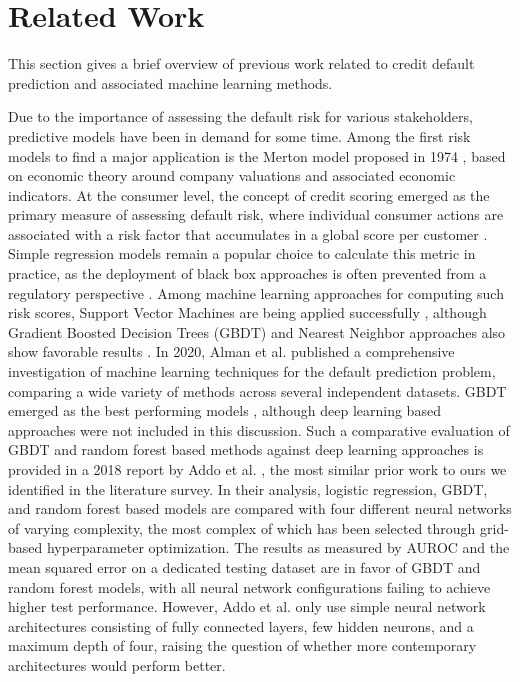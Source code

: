 \documentclass[runningheads]{llncs}
\begin{document}
\section{Related Work}
\label{sec:prereq}

This section gives a brief overview of previous work related to credit default prediction and associated machine learning methods.

Due to the importance of assessing the default risk for various stakeholders, predictive models have been in demand for some time. Among the first risk models to find a major application is the Merton model proposed in 1974 \cite{merton1974pricing}, based on economic theory around company valuations and associated economic indicators. At the consumer level, the concept of credit scoring emerged as the primary measure of assessing default risk, where individual consumer actions are associated with a risk factor that accumulates in a global score per customer \cite{hand1997statistical}. Simple regression models remain a popular choice to calculate this metric in practice, as the deployment of black box approaches is often prevented from a regulatory perspective \cite{lee2021graph}. Among machine learning approaches for computing such risk scores, Support Vector Machines are being applied successfully \cite{trustorff2011credit} \cite{moula2017credit}, although Gradient Boosted Decision Trees (GBDT) and Nearest Neighbor approaches also show favorable results \cite{alam2020investigation}. In 2020, Alman et al. published a comprehensive investigation of machine learning techniques for the default prediction problem, comparing a wide variety of methods across several independent datasets. GBDT emerged as the best performing models \cite{alam2020investigation}, although deep learning based approaches were not included in this discussion. Such a comparative evaluation of GBDT and random forest based methods against deep learning approaches is provided in a 2018 report by Addo et al. \cite{addo2018credit}, the most similar prior work to ours we identified in the literature survey. In their analysis, logistic regression, GBDT, and random forest based models are compared with four different neural networks of varying complexity, the most complex of which has been selected through grid-based hyperparameter optimization. The results as measured by AUROC and the mean squared error on a dedicated testing dataset are in favor of GBDT and random forest models, with all neural network configurations failing to achieve higher test performance. However, Addo et al. only use simple neural network architectures consisting of fully connected layers, few hidden neurons, and a maximum depth of four, raising the question of whether more contemporary architectures would perform better.
\end{document}
